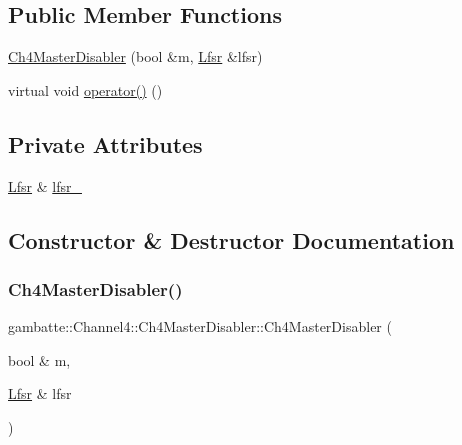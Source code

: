 \subsection*{Public Member Functions}
\begin{DoxyCompactItemize}
\item 
\hyperlink{classgambatte_1_1Channel4_1_1Ch4MasterDisabler_a53fe34a1bce0596c36dc917b4e967116}{Ch4\+Master\+Disabler} (bool \&m, \hyperlink{classgambatte_1_1Channel4_1_1Lfsr}{Lfsr} \&lfsr)
\item 
virtual void \hyperlink{classgambatte_1_1Channel4_1_1Ch4MasterDisabler_a7f9ddd23602b991df7ee5bb2a734cc99}{operator()} ()
\end{DoxyCompactItemize}
\subsection*{Private Attributes}
\begin{DoxyCompactItemize}
\item 
\hyperlink{classgambatte_1_1Channel4_1_1Lfsr}{Lfsr} \& \hyperlink{classgambatte_1_1Channel4_1_1Ch4MasterDisabler_a147cca0f452dcbd3df51343e925bac0a}{lfsr\+\_\+}
\end{DoxyCompactItemize}


\subsection{Constructor \& Destructor Documentation}
\mbox{\label{classgambatte_1_1Channel4_1_1Ch4MasterDisabler_a53fe34a1bce0596c36dc917b4e967116}} 
\subsubsection{\texorpdfstring{Ch4\+Master\+Disabler()}{Ch4MasterDisabler()}}
{\footnotesize\ttfamily gambatte\+::\+Channel4\+::\+Ch4\+Master\+Disabler\+::\+Ch4\+Master\+Disabler (\begin{DoxyParamCaption}\item[{bool \&}]{m,  }\item[{\hyperlink{classgambatte_1_1Channel4_1_1Lfsr}{Lfsr} \&}]{lfsr }\end{DoxyParamCaption})\hspace{0.3cm}{\ttfamily [inline]}}



